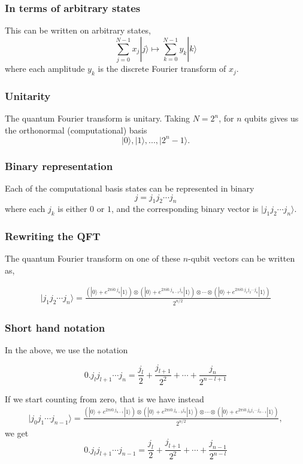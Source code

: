 \documentclass{beamer}
\begin{document}
\begin{frame}
\frametitle{In terms of arbitrary states}

This can be written on arbitrary states,
\[
\sum_{j=0}^{N-1}x_j|j\rangle \mapsto \sum_{k=0}^{N-1} y_k|k\rangle
\]
where each amplitude \(y_k\) is the discrete Fourier transform of
\(x_j\).
\end{frame}

\begin{frame}
\frametitle{Unitarity}

The quantum Fourier transform is unitary. Taking \(N = 2^n\),
for \(n\) qubits gives us the orthonormal (computational) basis
\[
|0\rangle, |1\rangle, ..., |2^{n}-1\rangle.
\]
\end{frame}

\begin{frame}
\frametitle{Binary representation}

Each of the computational basis states can be represented in binary
\[
j = j_1j_2 \cdots j_n
\]
where each \(j_k\) is either \(0\) or \(1\), and the corresponding
binary vector is \(|j_1j_2 \cdots j_n\rangle\).
\end{frame}

\begin{frame}
\frametitle{Rewriting the QFT}

The quantum Fourier
transform on one of these \(n\)-qubit vectors can be written as,

\begin{align*}
|j_1j_2 \cdots j_n \rangle = \frac{\left(|0\rangle +e^{2\pi i0.j_n}|1\rangle\right) \otimes \left(|0\rangle +e^{2\pi i0.j_{n-1}j_n}|1\rangle\right) \otimes \cdots \otimes \left(|0\rangle +e^{2\pi i0.j_1j_2 \cdots j_n}|1\rangle\right)}{2^{n/2}}
\end{align*}
\end{frame}

\begin{frame}
\frametitle{Short hand notation}

In the above, we use the notation

\[
0.j_lj_{l+1} \cdots j_n = \frac{j_l}{2} + \frac{j_{l+1}}{2^2} + \cdots + \frac{j_n}{2^{n-l+1}}
\]

If we start counting from zero, that is we have instead
\begin{align*}
|j_0j_1 \cdots j_{n-1} \rangle = \frac{\left(|0\rangle +e^{2\pi i0.j_{n-1}}|1\rangle\right) \otimes \left(|0\rangle +e^{2\pi i0.j_{n-2}j_n}|1\rangle\right) \otimes \cdots \otimes \left(|0\rangle +e^{2\pi i0.j_0j_1 \cdots j_{n-1}}|1\rangle\right)}{2^{n/2}},
\end{align*}
we get
\[
0.j_lj_{l+1} \cdots j_{n-1} = \frac{j_l}{2} + \frac{j_{l+1}}{2^2} + \cdots + \frac{j_{n-1}}{2^{n-l}}
\]
\end{frame}
\end{document}
